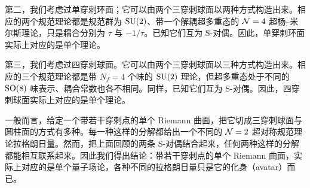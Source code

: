 
第二，我们考虑过单穿刺环面；它可以由两个三穿刺球面以两种方式构造出来。相应的两个规范理论都是规范群为 $\mathrm{SU}(2)$、带一个解耦超多重态的 $\mathcal{N}=4$ 超杨–米尔斯理论，只是耦合分别为 $\tau$ 与 $-1/\tau$。已知它们互为 S-对偶。因此，单穿刺环面实际上对应的是单个理论。


第三，我们考虑过四穿刺球面。它可以由两个三穿刺球面以三种方式构造出来。相应的三个规范理论都是带 $N_f=4$ 个味的 $\mathrm{SU}(2)$ 理论，但超多重态处于不同的 $\mathrm{SO}(8)$ 味表示、耦合常数也各不相同。同样，已知它们互为 S-对偶。因此，四穿刺球面实际上对应的是单个理论。


一般而言，给定一个带若干穿刺点的单个 Riemann 曲面，把它切成三穿刺球面与圆柱面的方式有多种。每一种这样的分解都给出一个不同的 $\mathcal{N}=2$ 超对称规范理论拉格朗日量。然而，把上面回顾的两条 S-对偶结合起来，任何两种这样的分解都能相互联系起来。因此我们得出结论：带若干穿刺点的单个 Riemann 曲面，实际上对应的是单个量子场论，各种不同的拉格朗日量只是它的化身（avatar）而已。



